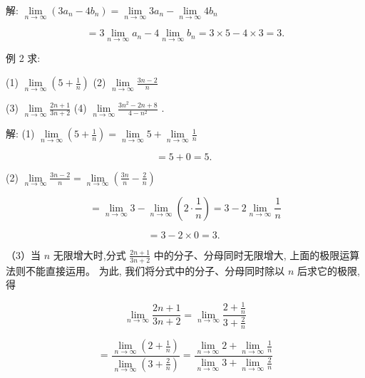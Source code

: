 \documentclass[lang=cn,newtx,12pt,scheme=chinese]{elegantbook}
\begin{document}
解: \(\mathop{\lim }\limits_{{n \rightarrow \infty }}\left( {3{a}_{n} - 4{b}_{n}}\right) = \mathop{\lim }\limits_{{n \rightarrow \infty }}3{a}_{n} - \mathop{\lim }\limits_{{n \rightarrow \infty }}4{b}_{n}\)

\[
= 3\mathop{\lim }\limits_{{n \rightarrow \infty }}{a}_{n} - 4\mathop{\lim }\limits_{{n \rightarrow \infty }}{b}_{n} = 3 \times 5 - 4 \times 3 = 3\text{.}
\]

例 2 求:

(1) \(\mathop{\lim }\limits_{{n \rightarrow \infty }}\left( {5 + \frac{1}{n}}\right)\) (2) \(\mathop{\lim }\limits_{{n \rightarrow \infty }}\frac{{3n} - 2}{n}\)

(3) \(\mathop{\lim }\limits_{{n \rightarrow \infty }}\frac{{2n} + 1}{{3n} + 2}\) (4) \(\mathop{\lim }\limits_{{n \rightarrow \infty }}\frac{3{n}^{2} - {2n} + 8}{4 - {n}^{2}}\) .

解: (1) \(\mathop{\lim }\limits_{{n \rightarrow \infty }}\left( {5 + \frac{1}{n}}\right) = \mathop{\lim }\limits_{{n \rightarrow \infty }}5 + \mathop{\lim }\limits_{{n \rightarrow \infty }}\frac{1}{n}\)

\[
= 5 + 0 = 5\text{. }
\]

(2) \(\mathop{\lim }\limits_{{n \rightarrow \infty }}\frac{{3n} - 2}{n} = \mathop{\lim }\limits_{{n \rightarrow \infty }}\left( {\frac{3n}{n} - \frac{2}{n}}\right)\)

\[
= \mathop{\lim }\limits_{{n \rightarrow \infty }}3 - \mathop{\lim }\limits_{{n \rightarrow \infty }}\left( {2 \cdot \frac{1}{n}}\right) = 3 - 2\mathop{\lim }\limits_{{n \rightarrow \infty }}\frac{1}{n}
\]

\[
= 3 - 2 \times 0 = 3\text{. }
\]

（3）当 \(n\) 无限增大时,分式 \(\frac{{2n} + 1}{{3n} + 2}\) 中的分子、分母同时无限增大, 上面的极限运算法则不能直接运用。 为此, 我们将分式中的分子、分母同时除以 \(n\) 后求它的极限,得

\[
\mathop{\lim }\limits_{{n \rightarrow \infty }}\frac{{2n} + 1}{{3n} + 2} = \mathop{\lim }\limits_{{n \rightarrow \infty }}\frac{2 + \frac{1}{n}}{3 + \frac{2}{n}}
\]

\[
= \frac{\mathop{\lim }\limits_{{n \rightarrow \infty }}\left( {2 + \frac{1}{n}}\right) }{\mathop{\lim }\limits_{{n \rightarrow \infty }}\left( {3 + \frac{2}{n}}\right) } = \frac{\mathop{\lim }\limits_{{n \rightarrow \infty }}2 + \mathop{\lim }\limits_{{n \rightarrow \infty }}\frac{1}{n}}{\mathop{\lim }\limits_{{n \rightarrow \infty }}3 + \mathop{\lim }\limits_{{n \rightarrow \infty }}\frac{2}{n}}
\]
\end{document}
